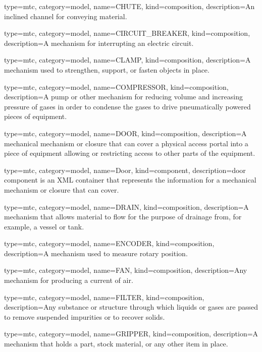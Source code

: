 {
  type=mtc,
  category=model,
  name={CHUTE},
  kind={composition},
  description={An inclined channel for conveying material.}
}


{
  type=mtc,
  category=model,
  name={CIRCUIT\_BREAKER},
  kind={composition},
  description={A mechanism for interrupting an electric circuit.}
}


{
  type=mtc,
  category=model,
  name={CLAMP},
  kind={composition},
  description={A mechanism used to strengthen, support, or fasten objects in place.}
}


{
  type=mtc,
  category=model,
  name={COMPRESSOR},
  kind={composition},
  description={A pump or other mechanism for reducing volume and increasing pressure of gases in order to condense the gases to drive pneumatically powered pieces of equipment.}
}


{
  type=mtc,
  category=model,
  name={DOOR},
  kind={composition},
  description={A mechanical mechanism or closure that can cover a physical access portal into a piece of equipment allowing or restricting access to other parts of the equipment.}
}


{
  type=mtc,
  category=model,
  name={Door},
  kind={component},
  description={\gls{door component} is an XML container that represents the information for a mechanical mechanism or closure that can cover.}
}


{
  type=mtc,
  category=model,
  name={DRAIN},
  kind={composition},
  description={A mechanism that allows material to flow for the purpose of drainage from, for example, a vessel or tank.}
}


{
  type=mtc,
  category=model,
  name={ENCODER},
  kind={composition},
  description={A mechanism used to measure rotary position.}
}


{
  type=mtc,
  category=model,
  name={FAN},
  kind={composition},
  description={Any mechanism for producing a current of air.}
}


{
  type=mtc,
  category=model,
  name={FILTER},
  kind={composition},
  description={Any substance or structure through which liquids or gases are passed to remove suspended impurities or to recover solids.}
}


{
  type=mtc,
  category=model,
  name={GRIPPER},
  kind={composition},
  description={A mechanism that holds a part, stock material, or any other item in place.}
}


